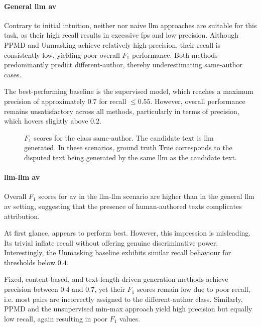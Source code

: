 \paragraph{General \ac{llm} \ac{av}}

Contrary to initial intuition, neither \mirrorMinds{} nor naive \ac{llm} approaches are suitable for this task, as their high recall results in excessive \acp{fp} and low precision.  
Although PPMD and Unmasking achieve relatively high precision, their recall is consistently low, yielding poor overall $F_1$ performance.  
Both methods predominantly predict different-author, thereby underestimating same-author cases.  

The best-performing baseline is the supervised model, which reaches a maximum precision of approximately $0.7$ for recall $\leq 0.55$.  
However, overall performance remains unsatisfactory across all methods, particularly in terms of precision, which hovers slightly above $0.2$.


\begin{figure}[h]
  \centering
  
  \caption{$F_1$ scores for the class same-author. 
The candidate text is \ac{llm} generated.
In these scenarios, ground truth True corresponds to the disputed text being generated by the same \ac{llm} as the candidate text.
}
  \label{fig:llm_av_prec}
\end{figure}



\paragraph{\ac{llm}-\ac{llm} \ac{av}}

Overall $F_1$ scores for \ac{av} in the \ac{llm}-\ac{llm} scenario are higher than in the general \ac{llm} \ac{av} setting, suggesting that the presence of human-authored texts complicates attribution.  

At first glance, \mirrorMinds{} appears to perform best. 
However, this impression is misleading.  
Its trivial \imps{} inflate recall without offering genuine discriminative power.  
Interestingly, the Unmasking baseline exhibits similar recall behaviour for thresholds below $0.4$.  

Fixed, content-based, and text-length-driven \imp{} generation methods achieve precision between $0.4$ and $0.7$, yet their $F_1$ scores remain low due to poor recall, i.e. most pairs are incorrectly assigned to the different-author class.  
Similarly, PPMD and the unsupervised min-max approach yield high precision but equally low recall, again resulting in poor $F_1$ values.  

